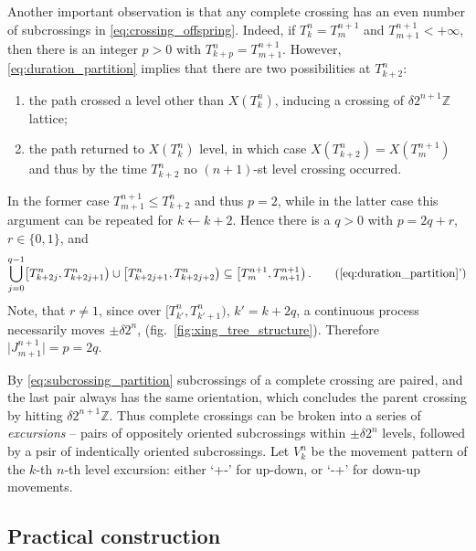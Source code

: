 \documentclass[a4paper]{article}
\begin{document}
Another important observation is that any complete crossing has an even number of
subcrossings in \eqref{eq:crossing_offspring}. Indeed, if $T_k^n = T_m^{n+1}$ and
$T_{m+1}^{n+1} < +\infty$, then there is an integer $p > 0$ with $T_{k+p}^n = T_{m+1}^{n+1}$.
However, \eqref{eq:duration_partition} implies that there are two possibilities at
$T_{k+2}^n$:
\begin{enumerate}
    \item the path crossed a level other than $X(T_k^n)$, inducing a crossing of
    $\delta 2^{n+1}\mathbb{Z}$ lattice;
    \item the path returned to $X(T_k^n)$ level, in which case $X(T_{k+2}^n) = X(T_m^{n+1})$
    and thus by the time $T_{k+2}^n$ no $(n+1)$-st level crossing occurred.
\end{enumerate}
In the former case $T_{m+1}^{n+1} \leq T_{k+2}^n$ and thus $p=2$, while in the latter
case this argument can be repeated for $k \leftarrow k+2$. Hence there is a $q > 0$
with $p = 2q + r$, $r \in \{0, 1\}$, and
\begin{equation*} \label{eq:subcrossing_partition}
    \bigcup_{j=0}^{q-1} \bigl[T_{k+2j}^n, T_{k+2j+1}^n\bigr)
                   \cup \bigl[T_{k+2j+1}^n, T_{k+2j+2}^n\bigr)
        \subseteq \bigl[T_m^{n+1}, T_{m+1}^{n+1}\bigr) \,.
        \tag{\ref{eq:duration_partition}'}
\end{equation*}
Note, that $r\neq 1$, since over $\bigl[T_{k'}^n, T_{k'+1}^n\bigr)$, $k' = k + 2q$,
a continuous process necessarily moves $\pm \delta 2^n$, (fig.~\ref{fig:xing_tree_structure}).
Therefore $\bigl| J_{m+1}^{n+1} \bigr| = p = 2q$.

By \eqref{eq:subcrossing_partition} subcrossings of a complete crossing are paired,
and the last pair always has the same orientation, which concludes the parent crossing
by hitting $\delta 2^{n+1} \mathbb{Z}$. Thus complete crossings can be broken into
a series of \emph{excursions} -- pairs of oppositely oriented subcrossings within
$\pm\delta 2^n$ levels, followed by a psir of indentically oriented subcrossings.
Let $V_k^n$ be the movement pattern of the $k$-th $n$-th level excursion: either
`+-' for up-down, or `-+' for down-up movements.


\subsection{Practical construction} %
\label{sub:practical_construction}
\end{document}
